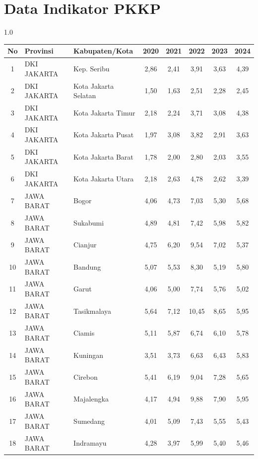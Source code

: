 \section*{Data Indikator PKKP}
\begin{spacing}{1.0}
\scriptsize
\setlength{\tabcolsep}{2pt}
\begin{longtable}{|c|p{2.2cm}|p{2.8cm}|c|c|c|c|c|}
\hline
\textbf{No} & \textbf{Provinsi} & \textbf{Kabupaten/Kota} & \textbf{2020} & \textbf{2021} & \textbf{2022} & \textbf{2023} & \textbf{2024} \\ \hline
\endhead
1 & DKI JAKARTA & Kep. Seribu & 2,86 & 2,41 & 3,91 & 3,63 & 4,39 \\ \hline
2 & DKI JAKARTA & Kota Jakarta Selatan & 1,50 & 1,63 & 2,51 & 2,28 & 2,45 \\ \hline
3 & DKI JAKARTA & Kota Jakarta Timur & 2,18 & 2,24 & 3,71 & 3,08 & 4,38 \\ \hline
4 & DKI JAKARTA & Kota Jakarta Pusat & 1,97 & 3,08 & 3,82 & 2,91 & 3,63 \\ \hline
5 & DKI JAKARTA & Kota Jakarta Barat & 1,78 & 2,00 & 2,80 & 2,03 & 3,55 \\ \hline
6 & DKI JAKARTA & Kota Jakarta Utara & 2,18 & 2,63 & 4,78 & 2,62 & 3,39 \\ \hline
7 & JAWA BARAT & Bogor & 4,06 & 4,73 & 7,03 & 5,30 & 5,68 \\ \hline
8 & JAWA BARAT & Sukabumi & 4,89 & 4,81 & 7,42 & 5,98 & 5,82 \\ \hline
9 & JAWA BARAT & Cianjur & 4,75 & 6,20 & 9,54 & 7,02 & 5,37 \\ \hline
10 & JAWA BARAT & Bandung & 5,07 & 5,53 & 8,30 & 5,19 & 5,80 \\ \hline
11 & JAWA BARAT & Garut & 4,06 & 5,00 & 7,74 & 5,76 & 5,02 \\ \hline
12 & JAWA BARAT & Tasikmalaya & 5,64 & 7,12 & 10,45 & 8,65 & 5,95 \\ \hline
13 & JAWA BARAT & Ciamis & 5,11 & 5,87 & 6,74 & 6,10 & 5,78 \\ \hline
14 & JAWA BARAT & Kuningan & 3,51 & 3,73 & 6,63 & 6,43 & 5,83 \\ \hline
15 & JAWA BARAT & Cirebon & 5,41 & 6,19 & 9,04 & 7,28 & 5,65 \\ \hline
16 & JAWA BARAT & Majalengka & 4,17 & 4,94 & 9,88 & 7,90 & 5,95 \\ \hline
17 & JAWA BARAT & Sumedang & 4,01 & 5,09 & 7,43 & 5,55 & 5,43 \\ \hline
18 & JAWA BARAT & Indramayu & 4,28 & 3,97 & 5,99 & 5,40 & 5,46 \\ \hline

\end{longtable}
\end{spacing}
